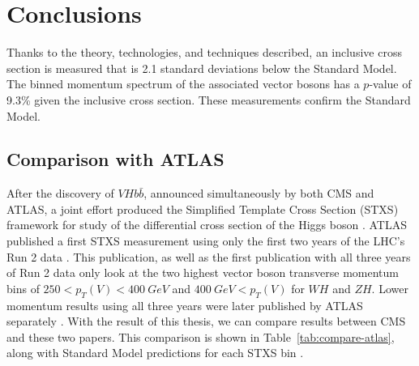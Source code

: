 \chapter{Conclusions} \label{ch:conclusion}

Thanks to the theory, technologies, and techniques described,
an inclusive cross section is measured that is 2.1 standard deviations below the Standard Model.
The binned momentum spectrum of the associated vector bosons
has a $p$-value of 9.3\% given the inclusive cross section.
These measurements confirm the Standard Model.

\section{Comparison with ATLAS}

After the discovery of $V\!Hb\bar{b}$, announced simultaneously by both CMS and ATLAS,
a joint effort produced the Simplified Template Cross Section (STXS)
framework for study of the differential cross section of the Higgs boson \cite{berger2019simplified}.
ATLAS published a first STXS measurement using only the first two years of the LHC's Run 2 data \cite{Aaboud_2019}.
This publication, as well as the first publication with all three years of Run 2 data \cite{Aad:2727500}
only look at the two highest vector boson transverse momentum bins of
$250 < p_T(V) < \SI{400}{GeV}$ and $\SI{400}{GeV} < p_T(V)$ for $W\!H$ and $Z\!H$.
Lower momentum results using all three years were later published by ATLAS separately \cite{Aad:2723187}.
With the result of this thesis, we can compare results between CMS and these two papers.
This comparison is shown in Table~\ref{tab:compare-atlas},
along with Standard Model predictions for each STXS bin \cite{de2016handbook}.
%
